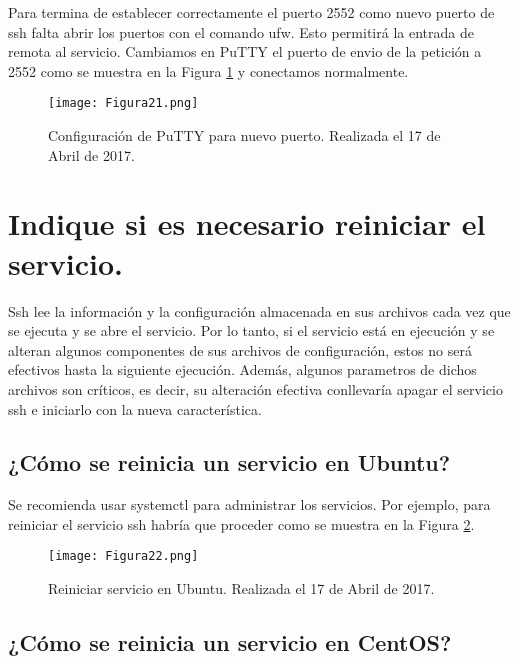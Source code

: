 Para termina de establecer correctamente el puerto 2552 como nuevo puerto de ssh falta abrir los puertos con el comando ufw. Esto permitirá la entrada de remota
al servicio. Cambiamos en PuTTY el puerto de envio de la petición a 2552 como se muestra en la Figura \ref{fig:figura21} y conectamos normalmente.

\begin{figure}[H] 
\centering
\texttt{[image: Figura21.png]}  
\caption{Configuración de PuTTY para nuevo puerto. Realizada el 17 de Abril de 2017.} \label{fig:figura21}
\end{figure}






\section{Indique si es necesario reiniciar el servicio.}

Ssh lee la información y la configuración almacenada en sus archivos cada vez que se ejecuta y se abre el servicio. Por lo tanto, si el servicio está en ejecución y
se alteran algunos componentes de sus archivos de configuración, estos no será efectivos hasta la siguiente ejecución. Además, algunos parametros de dichos archivos
son críticos, es decir, su alteración efectiva conllevaría apagar el servicio ssh e iniciarlo con la nueva característica.

\subsection{¿Cómo se reinicia un servicio en Ubuntu?}

Se recomienda usar systemctl\cite{systemctl} para administrar los servicios. Por ejemplo, para reiniciar el servicio ssh habría que proceder como se muestra en la 
Figura \ref{fig:figura22}.

\begin{figure}[H] 
\centering
\texttt{[image: Figura22.png]}  
\caption{Reiniciar servicio en Ubuntu. Realizada el 17 de Abril de 2017.} \label{fig:figura22}
\end{figure}

\subsection{¿Cómo se reinicia un servicio en CentOS?}

